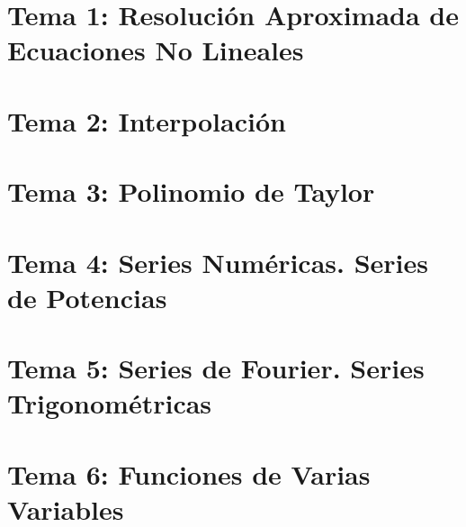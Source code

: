 \renewcommand{\contentsname}{Indice}
\tableofcontents
\newpage
\section{Tema 1: Resolución Aproximada de Ecuaciones No Lineales}

\newpage
\section{Tema 2: Interpolación}

\newpage
\section{Tema 3: Polinomio de Taylor}

\newpage
\section{Tema 4: Series Numéricas. Series de Potencias}

\newpage
\section{Tema 5: Series de Fourier. Series Trigonométricas}

\newpage
\section{Tema 6: Funciones de Varias Variables}
